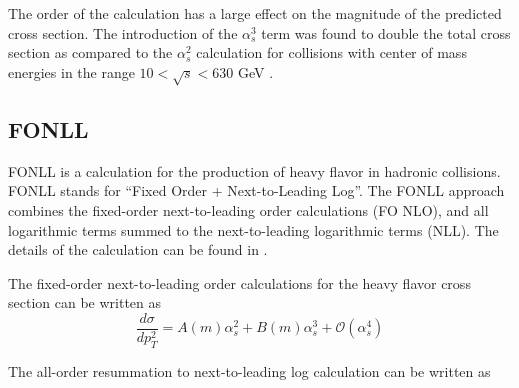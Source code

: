 The order of the calculation has a large effect on the magnitude of the predicted cross section. The introduction of the $\alpha_{s}^{3}$ term was found to double the total cross section as compared to the $\alpha_{s}^{2}$ calculation for collisions with center of mass energies in the range $10 < \sqrt{s} < 630 $ GeV \cite{Botner:1989jg}.





\subsection{FONLL}

FONLL \cite{Cacciari:1998it} is a calculation for the production of heavy flavor in hadronic collisions. FONLL stands for  ``Fixed Order + Next-to-Leading Log''. The FONLL approach combines the fixed-order next-to-leading order calculations (FO NLO), and all logarithmic terms summed to the next-to-leading logarithmic terms (NLL). The details of the calculation can be found in \cite{Cacciari:1998it}.

The fixed-order next-to-leading order calculations for the heavy flavor cross section can be written as \cite{Cacciari:1998it}
\begin{equation} \label{eqn:FO}
\frac{d \sigma}{d p_{T}^{2}} = A(m) \alpha_{s}^{2} + B(m) \alpha_{s}^{3} + \mathcal{O} (\alpha_{s}^{4}) 
\end{equation}

The all-order resummation to next-to-leading log calculation can be written as \cite{Cacciari:1998it}



